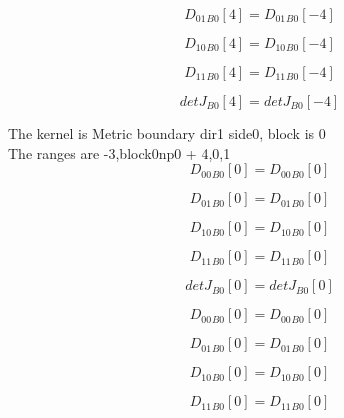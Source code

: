 \documentclass{article}
\begin{document}
\begin{dmath}{D_{01}{_{B0}}}[{4}] = {D_{01}{_{B0}}}[{-4}]\end{dmath}

\begin{dmath}{D_{10}{_{B0}}}[{4}] = {D_{10}{_{B0}}}[{-4}]\end{dmath}

\begin{dmath}{D_{11}{_{B0}}}[{4}] = {D_{11}{_{B0}}}[{-4}]\end{dmath}

\begin{dmath}{detJ{_{B0}}}[{4}] = {detJ{_{B0}}}[{-4}]\end{dmath}

\noindent The kernel is Metric boundary dir1 side0, block is 0\\\noindent The ranges are -3,block0np0 + 4,0,1\\\begin{dmath}{D_{00}{_{B0}}}[{0}] = {D_{00}{_{B0}}}[{0}]\end{dmath}

\begin{dmath}{D_{01}{_{B0}}}[{0}] = {D_{01}{_{B0}}}[{0}]\end{dmath}

\begin{dmath}{D_{10}{_{B0}}}[{0}] = {D_{10}{_{B0}}}[{0}]\end{dmath}

\begin{dmath}{D_{11}{_{B0}}}[{0}] = {D_{11}{_{B0}}}[{0}]\end{dmath}

\begin{dmath}{detJ{_{B0}}}[{0}] = {detJ{_{B0}}}[{0}]\end{dmath}

\begin{dmath}{D_{00}{_{B0}}}[{0}] = {D_{00}{_{B0}}}[{0}]\end{dmath}

\begin{dmath}{D_{01}{_{B0}}}[{0}] = {D_{01}{_{B0}}}[{0}]\end{dmath}

\begin{dmath}{D_{10}{_{B0}}}[{0}] = {D_{10}{_{B0}}}[{0}]\end{dmath}

\begin{dmath}{D_{11}{_{B0}}}[{0}] = {D_{11}{_{B0}}}[{0}]\end{dmath}
\end{document}
